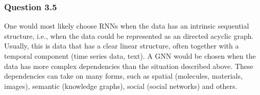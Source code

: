 \documentclass{article}
\begin{document}
\subsubsection*{Question 3.5}
One would most likely choose RNNs when the data has an intrinsic sequential structure, i.e., when the data could be represented as an directed acyclic graph. Usually, this is data that has a clear linear structure, often together with a temporal component (time series data, text). A GNN would be chosen when the data has more complex dependencies than the situation described above. These dependencies can take on many forms, such as spatial (molecules, materials, images), semantic (knowledge graphs), social (social networks) and others.
\end{document}
